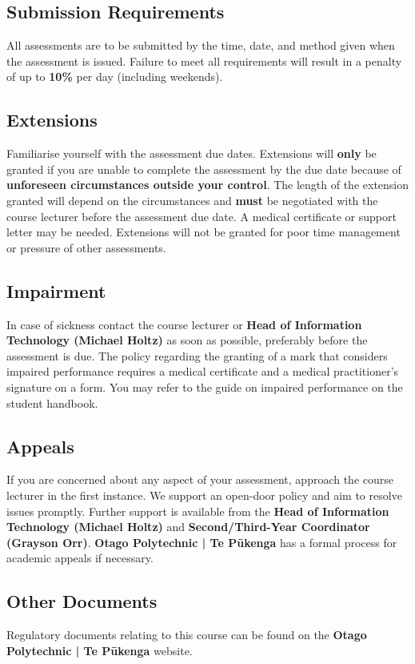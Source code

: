 \documentclass{article}
\begin{document}
\subsection*{Submission Requirements}
All assessments are to be submitted by the time, date, and method given when the assessment is issued. Failure to meet all requirements will result in a penalty of up to \textbf{10\%} per day (including weekends).

\subsection*{Extensions}
Familiarise yourself with the assessment due dates. Extensions will \textbf{only} be granted if you are unable to complete the assessment by the due date because of \textbf{unforeseen circumstances outside your control}. The length of the extension granted will depend on the circumstances and \textbf{must} be negotiated with the course lecturer before the assessment due date. A medical certificate or support letter may be needed. Extensions will not be granted for poor time management or pressure of other assessments.

\subsection*{Impairment}
In case of sickness contact the course lecturer or \textbf{Head of Information Technology (Michael Holtz)} as soon as possible, preferably before the assessment is due. The policy regarding the granting of a mark that considers impaired performance requires a medical certificate and a medical practitioner’s signature on a form. You may refer to the guide on impaired performance on the student handbook.

\subsection*{Appeals}
If you are concerned about any aspect of your assessment, approach the course lecturer in the first instance. We support an open-door policy and aim to resolve issues promptly. Further support is available from the \textbf{Head of Information Technology (Michael Holtz)} and \textbf{Second/Third-Year Coordinator (Grayson Orr)}. \textbf{Otago Polytechnic | Te Pūkenga} has a formal process for academic appeals if necessary.

\subsection*{Other Documents}
Regulatory documents relating to this course can be found on the \textbf{Otago Polytechnic | Te Pūkenga} website.
\end{document}
